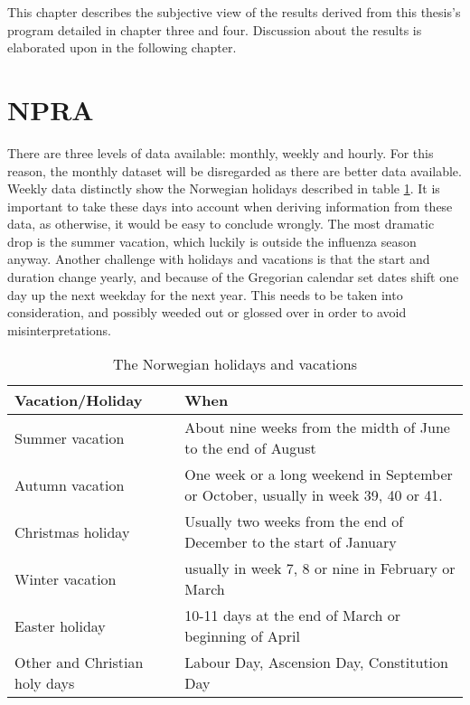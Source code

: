 This chapter describes the subjective view of the results derived from this thesis's program detailed in chapter three and four. Discussion about the results is elaborated upon in the following chapter.



\section{NPRA}
There are three levels of data available: monthly, weekly and hourly. For this reason, the monthly dataset will be disregarded as there are better data available. Weekly data distinctly show the Norwegian holidays described in table \ref{table:jesus}. It is important to take these days into account when deriving information from these data, as otherwise, it would be easy to conclude wrongly. The most dramatic drop is the summer vacation, which luckily is outside the influenza season anyway. Another challenge with holidays and vacations is that the start and duration change yearly, and because of the Gregorian calendar set dates shift one day up the next weekday for the next year. This needs to be taken into consideration, and possibly weeded out or glossed over in order to avoid misinterpretations.

\begin{center}
\begin{table}[!h]
\begin{tabular}{ | m{9em} | m{10cm}| }
 \hline
 \textbf{Vacation/Holiday} & \textbf{When} \\ [0.5ex] 
 \hline
 Summer vacation & About nine weeks from the midth of June to the end of August  \\ 
 \hline 
 Autumn vacation & One week or a long weekend in September or October, usually in week 39, 40 or 41.\\ 
 \hline
 Christmas holiday & Usually two weeks from the end of December to the start of January\\ 
 \hline
 Winter vacation & usually in week 7, 8 or nine in February or March \\ 
  \hline
 Easter holiday & 10-11 days at the end of March or beginning of April \\ 
  \hline
 Other and Christian holy days & Labour Day, Ascension Day, Constitution Day \\ 
  \hline
\end{tabular}
\caption{The Norwegian holidays and vacations}
 \label{table:jesus}
\end{table}
\end{center}

